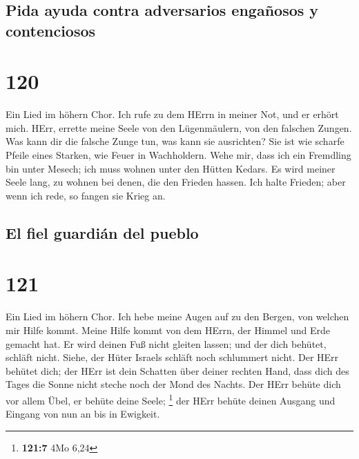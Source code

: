 \hypertarget{pida-ayuda-contra-adversarios-engauxf1osos-y-contenciosos}{%
\subsection{Pida ayuda contra adversarios engañosos y
contenciosos}\label{pida-ayuda-contra-adversarios-engauxf1osos-y-contenciosos}}

\hypertarget{section-119}{%
\section{120}\label{section-119}}

 Ein Lied im höhern Chor. Ich rufe zu dem HErrn in meiner
Not, und er erhört mich.  HErr, errette meine Seele von
den Lügenmäulern, von den falschen Zungen.  Was kann dir
die falsche Zunge tun, was kann sie ausrichten?  Sie ist
wie scharfe Pfeile eines Starken, wie Feuer in Wachholdern.
 Wehe mir, dass ich ein Fremdling bin unter Mesech; ich
muss wohnen unter den Hütten Kedars.  Es wird meiner Seele
lang, zu wohnen bei denen, die den Frieden hassen.  Ich
halte Frieden; aber wenn ich rede, so fangen sie Krieg an.

\hypertarget{el-fiel-guardiuxe1n-del-pueblo}{%
\subsection{El fiel guardián del
pueblo}\label{el-fiel-guardiuxe1n-del-pueblo}}

\hypertarget{section-120}{%
\section{121}\label{section-120}}

 Ein Lied im höhern Chor. Ich hebe meine Augen auf zu den
Bergen, von welchen mir Hilfe kommt.  Meine Hilfe kommt
von dem HErrn, der Himmel und Erde gemacht hat.  Er wird
deinen Fuß nicht gleiten lassen; und der dich behütet, schläft nicht.
 Siehe, der Hüter Israels schläft noch schlummert nicht.
 Der HErr behütet dich; der HErr ist dein Schatten über
deiner rechten Hand,  dass dich des Tages die Sonne nicht
steche noch der Mond des Nachts.  Der HErr behüte dich vor
allem Übel, er behüte deine Seele; \footnote{\textbf{121:7} 4Mo 6,24}
 der HErr behüte deinen Ausgang und Eingang von nun an bis
in Ewigkeit.

